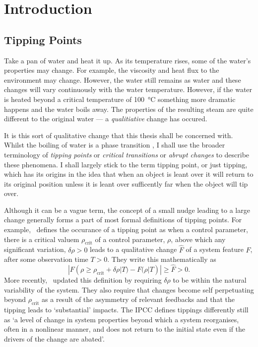 \chapter{Introduction}
\graphicspath{{introduction/figs}}

\section{Tipping Points}
Take a pan of water and heat it up. As its temperature rises, some of the water's properties may change. For example, the viscosity and heat flux to the
environment may change. However, the water still remains as water and these changes will vary continuously with the water temperature. However, if the water is heated beyond
a critical temperature of \SI{100}{\degreeCelsius} something more dramatic happens and the water boils away. The properties of the resulting steam are quite different
to the original water --- a \emph{qualitiative} change has occured.

It is this sort of qualitative change that this thesis shall be concerned with. Whilst the boiling of water is a phase transition \parencite{Goldenfeld1992}, I shall use the broader terminology
of \emph{tipping points} \parencite{Lenton2008} or \emph{critical transitions} \parencite{Rahmstorf1995} or \emph{abrupt changes} \parencite{Alley2003} to describe these phenomena. I shall largely stick
to the term tipping point, or just tipping, which has its origins in the idea that when an object is leant over it will return to its original position unless it is leant over sufficently far when the object
will tip over.

Although it can be a vague term, the concept of a small nudge leading to a large change generally forms a part of most formal definitions of tipping points.
For example,~\cite{Lenton2008} defines the occurance of a tipping
point as when a control parameter, there is a critical valuem $\rho_{\mathrm{crit}}$ of a control parameter, $\rho$, above which any significant variation, $\delta \rho > 0$ leads to a qualitative change
$\hat{F}$ of a system feature $F$, after some observation time $T > 0$. They write this mathematically as
\begin{equation}
  \label{eq:lenton_tipping_definition}
  |F(\rho \geq \rho_{\mathrm{crit}} + \delta \rho | T) - F(\rho|T)| \geq \hat{F} > 0.
\end{equation}
More recently,~\cite{ArmstrongMcKay2022} updated this definition by requiring $\delta \rho$ to be within the natural variability of the system. They also require that changes become self perpetuating
beyond $\rho_{\mathrm{crit}}$ as a result of the asymmetry of relevant feedbacks and that the tipping leads to `substantial' impacts. The IPCC \parencite{AR6} defines tippings differently still
as `a level of change in system properties beyond which a system reorganises, often in a nonlinear manner, and does not return to the initial state even if the drivers of the change are abated'.

